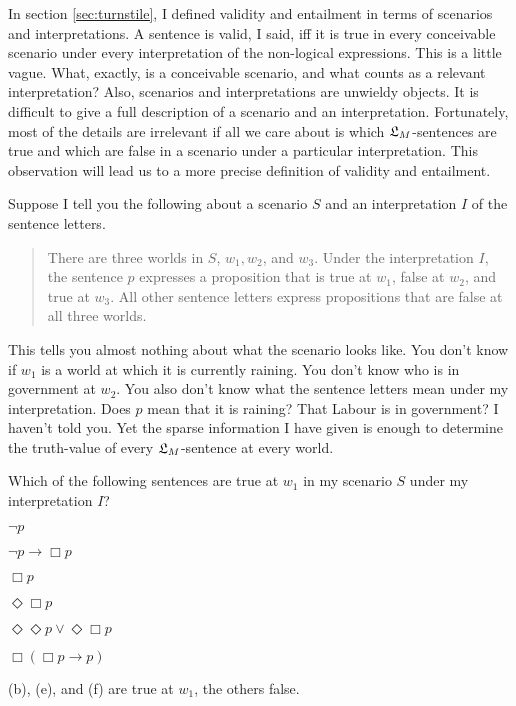In section \ref{sec:turnstile}, I defined validity and entailment in terms of
scenarios and interpretations. A sentence is valid, I said, iff it is true in
every conceivable scenario under every interpretation of the non-logical
expressions. This is a little vague. What, exactly, is a conceivable scenario,
and what counts as a relevant interpretation? Also, scenarios and
interpretations are unwieldy objects. It is difficult to give a full description
of a scenario and an interpretation. Fortunately, most of the details are
irrelevant if all we care about is which $\mathfrak{L}_{M}$-sentences are true and which
are false in a scenario under a particular interpretation. This observation will
lead us to a more precise definition of validity and entailment.

Suppose I tell you the following about a scenario $S$ and an interpretation $I$
of the sentence letters.

\begin{quote}
  There are three worlds in $S$, $w_{1}, w_{2}$, and $w_{3}$. Under the
  interpretation $I$, the sentence $p$ expresses a proposition that is true at
  $w_{1}$, false at $w_{2}$, and true at $w_{3}$. All other sentence letters
  express propositions that are false at all three worlds.
\end{quote}

This tells you almost nothing about what the scenario looks like. You don't know
if $w_{1}$ is a world at which it is currently raining. You don't know who is in
government at $w_{2}$. You also don't know what the sentence letters mean under
my interpretation. Does $p$ mean that it is raining? That Labour is in
government? I haven't told you. Yet the sparse information I have given is
enough to determine the truth-value of every $\mathfrak{L}_{M}$-sentence at every world.

\begin{exercise}
  Which of the following sentences are true at $w_{1}$ in my scenario $S$ under
  my interpretation $I$?
  \begin{exlist}
  \item $\neg p$ %
  \item $\neg p \to \Box p$ %
  \item $\Box p$ %
  \item $\Diamond\Box p$ %
  \item $\Diamond \Diamond p \lor \Diamond \Box p$ %
  \item $\Box (\Box p \to p)$ %
  \end{exlist}
\end{exercise}
\begin{solution}
  (b), (e), and (f) are true at $w_{1}$, the others false.
\end{solution}

